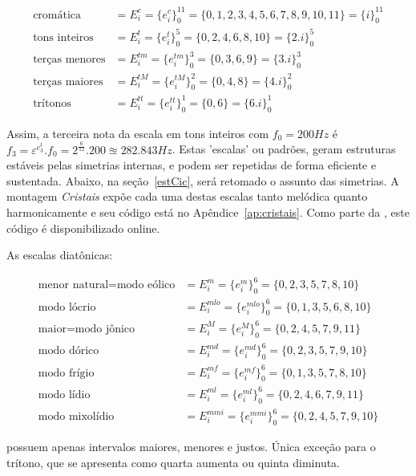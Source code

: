 \begin{equation}\label{escSim}
\begin{split}
\text{cromática} & = E_i^c = \{e_i^c\}_0^{11} =  \{0,1,2,3,4,5,6,7,8,9,10,11\} = \{i\}_0^{11}\\
\text{tons inteiros} & = E_i^t = \{e_i^t\}_0^{5} = \{0,2,4,6,8,10\} = \{2.i\}_0^{5} \\
\text{terças menores} & = E_i^{tm} = \{e_i^{tm}\}_0^{3} = \{0,3,6,9\} = \{3.i\}_0^3 \\
\text{terças maiores} & = E_i^{tM} = \{e_i^{tM}\}_0^{2} = \{0,4,8\} = \{4.i\}_0^2\\
\text{trítonos} & = E_i^{tt} = \{e_i^{tt}\}_0^{1} = \{ 0, 6 \} = \{6.i\}_0^1
\end{split}
\end{equation}

Assim, a terceira nota da escala em tons inteiros com $f_0=200Hz$
é $f_3=\varepsilon^{e_3^t} . f_0 = 2^{\frac{6}{12}} . 200 \approxeq 282.843 Hz$. Estas
'escalas' ou padrões, geram estruturas estáveis pelas simetrias internas, e podem ser
repetidas de forma eficiente e sustentada. Abaixo, na seção~\ref{estCic}, será retomado o assunto das simetrias. A montagem \emph{Cristais} expõe cada uma destas escalas tanto melódica quanto harmonicamente e seu código está no Apêndice~\ref{ap:cristais}. Como parte da \massa, este código é disponibilizado online.

As escalas diatônicas:

\begin{equation}\label{eq:escalas}
\begin{split}
\text{menor natural} = \text{modo eólico} & = E_i^m = \{e_i^m\}_0^6 = \{0,2,3,5,7,8,10\} \\
\text{modo lócrio} & = E_i^{mlo} = \{e_i^{mlo}\}_0^6 = \{0,1,3,5,6,8,10\} \\ 
\text{maior}  = \text{modo jônico} & = E_i^M = \{e_i^M\}_0^6 = \{0,2,4,5,7,9,11\} \\
\text{modo dórico} & = E_i^{md} = \{e_i^{md}\}_0^6 = \{0,2,3,5,7,9,10\} \\
\text{modo frígio} & = E_i^{mf} = \{e_i^{mf}\}_0^6 = \{0,1,3,5,7,8,10\} \\
\text{modo lídio} & = E_i^{ml}=\{e_i^{ml}\}_0^6 = \{0,2,4,6,7,9,11\} \\
\text{modo mixolídio} & = E_i^{mmi} = \{e_i^{mmi}\}_0^6 = \{0,2,4,5,7,9,10\}
\end{split}
\end{equation}

possuem apenas intervalos maiores, menores e justos. Única exceção para o trítono, que se apresenta como quarta aumenta ou quinta diminuta.

